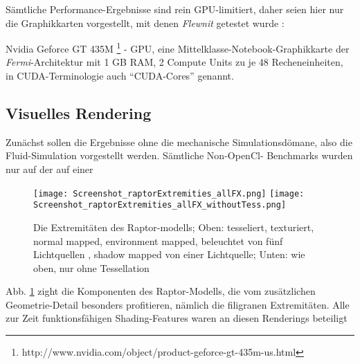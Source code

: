 
\label{sec:ergebnisse}

Sämtliche Performance-Ergebnisse sind rein GPU-limitiert, daher seien hier nur die
Graphikkarten vorgestellt, mit denen \emph{Flewnit} getestet wurde :

Nvidia Geforce GT 435M 
	\footnote{http://www.nvidia.com/object/product-geforce-gt-435m-us.html} - GPU, eine
	Mittelklasse-Notebook-Graphikkarte der \emph{Fermi}-Architektur mit 1 GB RAM,
	2 Compute Units zu je 48 Recheneinheiten, in CUDA-Terminologie auch "`CUDA-Cores"' genannt.

\subsection{Visuelles Rendering}

	Zunächst sollen die Ergebnisse ohne die mechanische Simulationsdömane, also die Fluid-Simulation
	vorgestellt werden.
	Sämtliche Non-OpenCl- Benchmarks wurden nur auf der auf einer 
	

\begin{figure}[!h]

	\texttt{[image: Screenshot\_raptorExtremities\_allFX.png]} 
	\texttt{[image: Screenshot\_raptorExtremities\_allFX\_withoutTess.png]}

	\caption{Die Extremitäten des Raptor-modells; Oben: tesseliert, texturiert, normal mapped, environment mapped, 
	beleuchtet von fünf Lichtquellen , shadow mapped von einer Lichtquelle; Unten: wie oben, nur ohne Tessellation
	}
	\label{fig:raptorExtremitiesTessVSNonTess}
\end{figure}

	Abb. \ref{fig:raptorExtremitiesTessVSNonTess} zight die Komponenten des Raptor-Modells, die vom
	zusätzlichen Geometrie-Detail besonders profitieren, nämlich die filigranen Extremitäten.
	Alle zur Zeit funktionsfähigen Shading-Features waren an diesen Renderings beteiligt




